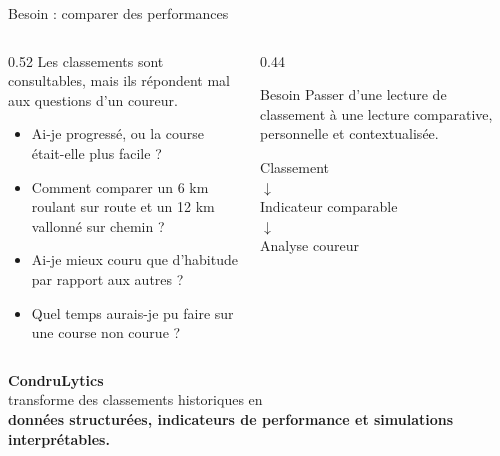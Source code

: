 \documentclass[aspectratio=169,11pt]{beamer}
\begin{document}
\begin{frame}{Besoin : comparer des performances}
  \begin{columns}[T,onlytextwidth]
    \begin{column}{0.52\textwidth}
      Les classements sont consultables, mais ils répondent mal aux questions d'un coureur.
      \vspace{0.3cm}
      \begin{itemize}
        \item Ai-je progressé, ou la course était-elle plus facile ?
        \item Comment comparer un 6 km roulant sur route et un 12 km vallonné sur chemin ?
        \item Ai-je mieux couru que d'habitude par rapport aux autres ?
        \item Quel temps aurais-je pu faire sur une course non courue ?
      \end{itemize}
    \end{column}
    \begin{column}{0.44\textwidth}
      \begin{block}{Besoin}
        Passer d'une lecture de classement à une lecture comparative, personnelle et contextualisée.
      \end{block}
      \vspace{0.35cm}
      \centering
      {\Large Classement}\\[0.15cm]
      {\color{condruGreen}\Large $\downarrow$}\\[0.15cm]
      {\Large Indicateur comparable}\\[0.15cm]
      {\color{condruGreen}\Large $\downarrow$}\\[0.15cm]
      {\Large Analyse coureur}
    \end{column}
  \end{columns}
\end{frame}

\begin{frame}{}
  \begin{center}
    \vspace{0.8cm}
    {\huge\bfseries\color{condruBlue} CondruLytics}\\[0.5cm]
    {\Large transforme des classements historiques en}\\[0.2cm]
    {\Large\bfseries données structurées, indicateurs de performance et simulations interprétables.}
  \end{center}
\end{frame}
\end{document}
